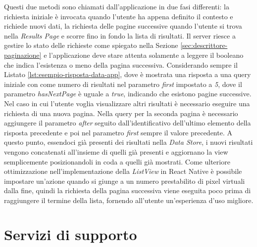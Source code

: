 Questi due metodi sono chiamati dall'applicazione in due fasi differenti: la richiesta iniziale è invocata quando l'utente ha appena definito il contesto e richiede nuovi dati, la richiesta delle pagine successive quando l'utente si trova nella \emph{Results Page} e scorre fino in fondo la lista di risultati. 
Il server riesce a gestire lo stato delle richieste come spiegato nella Sezione \ref{sec:descrittore-paginazione} e l'applicazione deve stare attenta solamente a leggere il booleano che indica l'esistenza o meno della pagina successiva.
Considerando sempre il Listato \ref{lst:esempio-risposta-data-app}, dove è mostrata una risposta a una query iniziale con come numero di risultati nel parametro \emph{first} impostato a \emph{5}, dove il parametro \emph{hasNextPage} è uguale a \emph{true}, indicando che esistono pagine successive. Nel caso in cui l'utente voglia visualizzare altri risultati è necessario eseguire una richiesta di una nuova pagina. Nella query per la seconda pagina è necessario aggiungere il parametro \emph{after} seguito dall'identificativo dell'ultimo elemento della risposta precedente e poi nel parametro \emph{first} sempre il valore precedente. A questo punto, essendoci già presenti dei risultati nella \emph{Data Store}, i nuovi risultati vengono concatenati all'insieme di quelli già presenti e aggiornano la view semplicemente posizionandoli in coda a quelli già mostrati. Come ulteriore ottimizzazione nell'implementazione della \emph{ListView} in React Native è possibile impostare un'azione quando si giunge a un numero prestabilito di pixel virtuali dalla fine, quindi la richiesta della pagina successiva viene eseguita poco prima di raggiungere il termine della lista, fornendo all'utente un'esperienza d'uso migliore.

\section{Servizi di supporto}\label{sec:servizi-supporto-app}

